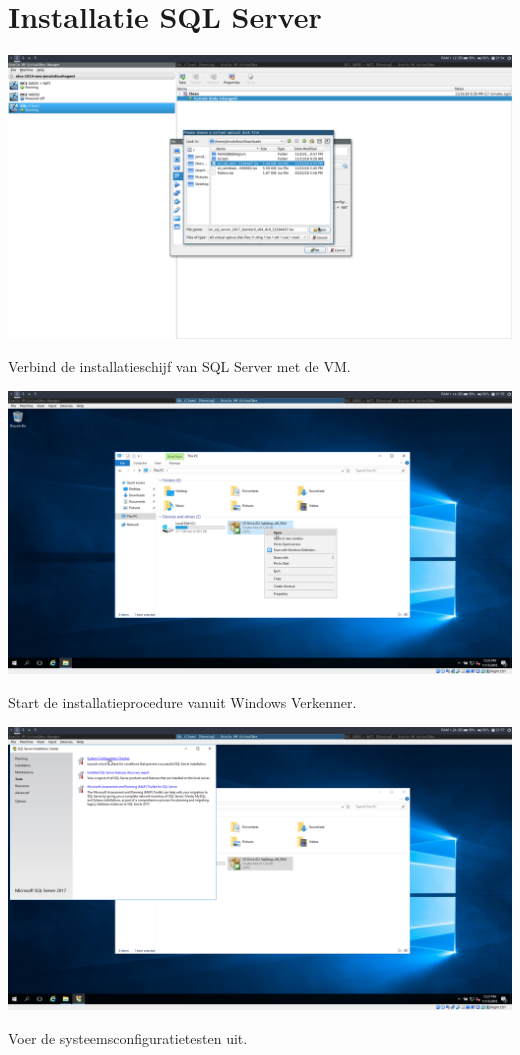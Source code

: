 \documentclass[a4paper]{article}
\begin{document}
\clearpage

\section{Installatie SQL Server}
	
\begin{center}
	\includegraphics[width=15cm]{Pictures/SQL/1542315276.png}
	
	Verbind de installatieschijf van SQL Server met de VM.
\end{center}
\begin{center}
	\includegraphics[width=15cm]{Pictures/SQL/1542315338.png}
	
	Start de installatieprocedure vanuit Windows Verkenner.
\end{center}
\begin{center}
	\includegraphics[width=15cm]{Pictures/SQL/1542315421.png}
	
	Voer de systeemsconfiguratietesten uit.
\end{center}
\end{document}
